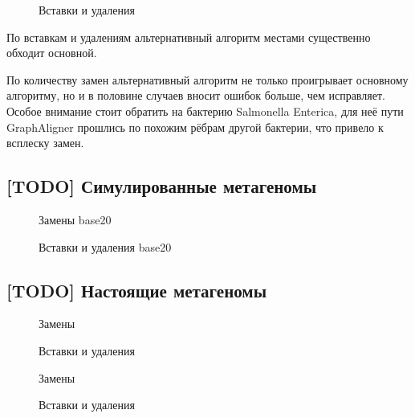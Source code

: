 \documentclass[14pt]{matmex-diploma-custom}
\begin{document}
\begin{figure}[h]
    \centering
    
    \caption{Вставки и удаления}
    \label{fig:indels_ga}
\end{figure}

По вставкам и удалениям альтернативный алгоритм местами существенно обходит основной.

По количеству замен альтернативный алгоритм не только проигрывает основному алгоритму, но и в половине случаев вносит ошибок больше, чем исправляет. Особое внимание стоит обратить на бактерию Salmonella Enterica, для неё пути GraphAligner прошлись по похожим рёбрам другой бактерии, что привело к всплеску замен.


\subsection{[TODO] Симулированные метагеномы}
\begin{figure}[h]
    \centering
    
    \caption{Замены base20}
    \label{fig:mismatches_base20_onto}
\end{figure}

\begin{figure}[h]
    \centering
    
    \caption{Вставки и удаления base20}
    \label{fig:indels_base20_onto}
\end{figure}

\subsection{[TODO] Настоящие метагеномы}
\begin{figure}[h]
    \centering
    
    \caption{Замены}
    \label{fig:mismatches_bmock12}
\end{figure}

\begin{figure}[h]
    \centering
    
    \caption{Вставки и удаления}
    \label{fig:indels_bmock12}
\end{figure}

\begin{figure}[h]
    \centering
    
    \caption{Замены}
    \label{fig:mismatches_zymo}
\end{figure}

\begin{figure}[h]
    \centering
    
    \caption{Вставки и удаления}
    \label{fig:indels_zymo}
\end{figure}
\end{document}
